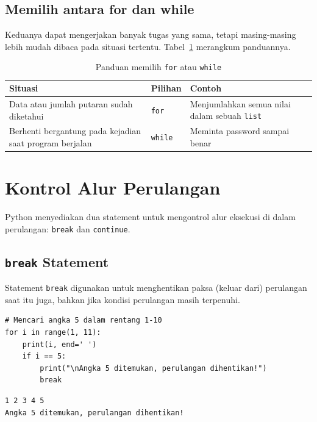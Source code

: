 \subsection{Memilih antara for dan while}
Keduanya dapat mengerjakan banyak tugas yang sama, tetapi masing-masing lebih mudah dibaca pada situasi tertentu. Tabel~\ref{tab:b5-for-while} merangkum panduannya.

\begin{table}[H]
  \centering
  \caption{Panduan memilih \texttt{for} atau \texttt{while}}
  \label{tab:b5-for-while}
  \begin{tabularx}{\textwidth}{XlX}
    \hline
    \textbf{Situasi} & \textbf{Pilihan} & \textbf{Contoh} \\
    \hline
    Data atau jumlah putaran sudah diketahui & \texttt{for} & Menjumlahkan semua nilai dalam sebuah \texttt{list} \\
    \hline
    Berhenti bergantung pada kejadian saat program berjalan & \texttt{while} & Meminta password sampai benar \\
    \hline
  \end{tabularx}
\end{table}

\section{Kontrol Alur Perulangan}
Python menyediakan dua statement untuk mengontrol alur eksekusi di dalam perulangan: \texttt{break} dan \texttt{continue}.

\subsection{\texttt{break} Statement}
Statement \texttt{break} digunakan untuk menghentikan paksa (keluar dari) perulangan saat itu juga, bahkan jika kondisi perulangan masih terpenuhi.

\begin{lstlisting}[style=PythonStyle, caption={Kode Python: break_keyword.py}, label={lst:b5-break}]
# Mencari angka 5 dalam rentang 1-10
for i in range(1, 11):
    print(i, end=' ')
    if i == 5:
        print("\nAngka 5 ditemukan, perulangan dihentikan!")
        break 
\end{lstlisting}

\begin{lstlisting}[language=bash, caption={Keluaran break_keyword.py}, label={lst:b5-break-out}]
1 2 3 4 5
Angka 5 ditemukan, perulangan dihentikan!
\end{lstlisting}


